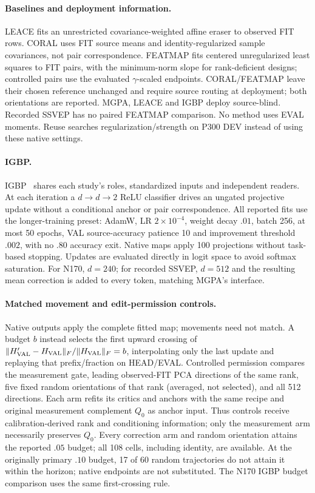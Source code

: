 \paragraph{Baselines and deployment information.}
LEACE fits an unrestricted covariance-weighted affine eraser to observed
FIT rows. CORAL uses FIT source means and identity-regularized sample
covariances, not pair correspondence. FEATMAP fits centered unregularized
least squares to FIT pairs, with the minimum-norm slope for rank-deficient
designs; controlled pairs use the evaluated $\gamma$-scaled endpoints.
CORAL/FEATMAP leave their chosen reference unchanged and require source
routing at deployment; both orientations are reported. MGPA, LEACE and
IGBP deploy source-blind. Recorded SSVEP has no paired FEATMAP comparison.
No method uses EVAL moments. Reuse searches regularization/strength on
P300 DEV instead of using these native settings.

\paragraph{IGBP.}
\label{app:igbp-protocol}
IGBP~\citep{iskander2023} shares each study's roles, standardized inputs and
independent readers. At each iteration a $d\to d\to2$ ReLU classifier
drives an ungated projective update without a conditional anchor or pair
correspondence. All reported fits use the longer-training preset: AdamW,
LR $2\times10^{-4}$, weight decay $.01$, batch 256, at most 50 epochs,
VAL source-accuracy patience 10 and improvement threshold $.002$, with no
$.80$ accuracy exit. Native maps apply 100 projections without task-based
stopping. Updates are evaluated directly in logit space to avoid softmax
saturation. For N170, $d=240$; for recorded SSVEP, $d=512$ and the resulting
mean correction is added to every token, matching MGPA's interface.

\paragraph{Matched movement and edit-permission controls.}
\label{app:gate-attribution}
Native outputs apply the complete fitted map; movements need not match.
A budget $b$ instead selects the first
upward crossing of $\|H'_{\rm VAL}-H_{\rm VAL}\|_F/\|H_{\rm VAL}\|_F=b$,
interpolating only the last update and replaying that prefix/fraction on
HEAD/EVAL. Controlled permission compares the measurement gate, leading
observed-FIT PCA directions of the same rank, five fixed random orientations
of that rank (averaged, not selected), and all 512 directions. Each arm
refits its critics and anchors with the same recipe and original measurement
complement $Q_0$ as anchor input. Thus controls receive calibration-derived
rank and conditioning information; only the measurement arm necessarily
preserves $Q_0$. Every correction arm and random orientation attains the
reported $.05$ budget; all 108 cells, including identity, are available.
At the originally primary $.10$ budget, 17 of 60 random trajectories
do not attain it within the horizon; native endpoints are not substituted.
The N170 IGBP budget comparison uses the same first-crossing rule.

